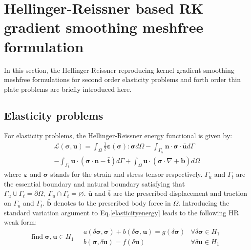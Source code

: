 \documentclass{article}
\begin{document}
\section{Hellinger-Reissner based RK gradient smoothing meshfree formulation}

In this section, the Hellinger-Reissner reproducing kernel gradient smoothing meshfree formulations for second order elasticity problems and forth order thin plate problems are briefly introduced here.

\subsection{Elasticity problems}

For elasticity problems, the Hellinger-Reissner energy functional is given by:
\begin{multline}\label{elasticityenergy}
    \mathcal L(\boldsymbol \sigma, \boldsymbol u) = \int_{\Omega} \frac{1}{2} \boldsymbol \varepsilon(\boldsymbol \sigma) : \boldsymbol \sigma d\Omega - \int_{\Gamma_u} \boldsymbol n \cdot \boldsymbol \sigma \cdot \bar{\boldsymbol u} d\Gamma \\
    - \int_{\Gamma_t} \boldsymbol u \cdot (\boldsymbol \sigma \cdot \boldsymbol n - \bar{\boldsymbol t}) d\Gamma + \int_{\Omega} \boldsymbol u \cdot (\boldsymbol \sigma \cdot \nabla + \bar{\boldsymbol b}) d\Omega
\end{multline}
where $\boldsymbol \varepsilon$ and $\boldsymbol \sigma$ stands for the strain and stress tensor respectively. $\Gamma_u$ and $\Gamma_t$ are the essential boundary and natural boundary satisfying that $\Gamma_u \cup \Gamma_t = \partial \Omega,\; \Gamma_u \cap \Gamma_t = \varnothing$. $\bar{\boldsymbol u}$ and $\bar{\boldsymbol t}$ are the prescribed displacement and traction on $\Gamma_u$ and $\Gamma_t$. $\bar{\boldsymbol b}$ denotes to the prescribed body force in $\Omega$. Introducing the standard variation argument to Eq.\ref{elasticityenergy} leads to the following HR weak form:
\begin{equation}
    \mathrm{find} \; \boldsymbol \sigma, \boldsymbol u \in H_1 \quad
    \begin{array}{rr}
    a(\delta \boldsymbol \sigma,\boldsymbol \sigma) + b(\delta \boldsymbol \sigma, \boldsymbol u) = g(\delta \boldsymbol \sigma) & \forall \delta \boldsymbol \sigma \in H_1 \\
    b(\boldsymbol \sigma, \delta \boldsymbol u) = f(\delta \boldsymbol u) & \forall \delta \boldsymbol u \in H_1
    \end{array}
\end{equation}
\end{document}
